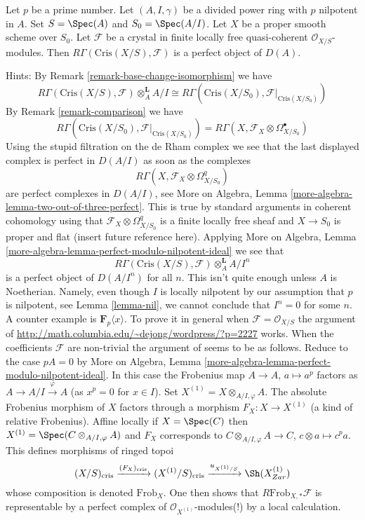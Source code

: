 \begin{remark}[Perfectness]
\label{remark-perfect}
Let $p$ be a prime number. Let $(A, I, \gamma)$ be a divided power
ring with $p$ nilpotent in $A$. Set $S = \Spec(A)$ and
$S_0 = \Spec(A/I)$. Let $X$ be a proper smooth scheme over $S_0$.
Let $\mathcal{F}$ be a crystal in finite locally free
quasi-coherent $\mathcal{O}_{X/S}$-modules.
Then $R\Gamma(\text{Cris}(X/S), \mathcal{F})$ is a
perfect object of $D(A)$.

\medskip\noindent
Hints: By Remark \ref{remark-base-change-isomorphism} we have
$$
R\Gamma(\text{Cris}(X/S), \mathcal{F}) \otimes_A^\mathbf{L} A/I
\cong
R\Gamma(\text{Cris}(X/S_0), \mathcal{F}|_{\text{Cris}(X/S_0)})
$$
By Remark \ref{remark-comparison} we have
$$
R\Gamma(\text{Cris}(X/S_0), \mathcal{F}|_{\text{Cris}(X/S_0)}) =
R\Gamma(X, \mathcal{F}_X \otimes \Omega^\bullet_{X/S_0})
$$
Using the stupid filtration on the de Rham complex we see that
the last displayed complex is perfect in $D(A/I)$ as soon as the complexes
$$
R\Gamma(X, \mathcal{F}_X \otimes \Omega^q_{X/S_0})
$$
are perfect complexes in $D(A/I)$, see
More on Algebra, Lemma \ref{more-algebra-lemma-two-out-of-three-perfect}.
This is true by standard arguments
in coherent cohomology using that $\mathcal{F}_X \otimes \Omega^q_{X/S_0}$
is a finite locally free sheaf and $X \to S_0$ is proper and flat
(insert future reference here). Applying
More on Algebra, Lemma \ref{more-algebra-lemma-perfect-modulo-nilpotent-ideal}
we see that
$$
R\Gamma(\text{Cris}(X/S), \mathcal{F}) \otimes_A^\mathbf{L} A/I^n
$$
is a perfect object of $D(A/I^n)$ for all $n$. This isn't quite enough
unless $A$ is Noetherian. Namely, even though $I$ is locally nilpotent
by our assumption that $p$ is nilpotent, see Lemma \ref{lemma-nil},
we cannot conclude that $I^n = 0$ for some $n$. A counter example
is $\mathbf{F}_p\langle x \rangle$. To prove it in general when
$\mathcal{F} = \mathcal{O}_{X/S}$ the argument of
\url{http://math.columbia.edu/~dejong/wordpress/?p=2227}
works. When the coefficients $\mathcal{F}$ are non-trivial the
argument of \cite{Faltings-very} seems to be as follows. Reduce to the
case $pA = 0$ by More on Algebra, Lemma
\ref{more-algebra-lemma-perfect-modulo-nilpotent-ideal}.
In this case the Frobenius map $A \to A$, $a \mapsto a^p$ factors
as $A \to A/I \xrightarrow{\varphi} A$ (as $x^p = 0$ for $x \in I$). Set
$X^{(1)} = X \otimes_{A/I, \varphi} A$. The absolute Frobenius morphism
of $X$ factors through a morphism $F_X : X \to X^{(1)}$ (a kind of
relative Frobenius). Affine locally if $X = \Spec(C)$ then
$X^{(1)} = \Spec( C \otimes_{A/I, \varphi} A)$
and $F_X$ corresponds to $C \otimes_{A/I, \varphi} A \to C$,
$c \otimes a \mapsto c^pa$. This defines morphisms of ringed topoi
$$
(X/S)_{\text{cris}}
\xrightarrow{(F_X)_{\text{cris}}}
(X^{(1)}/S)_{\text{cris}}
\xrightarrow{u_{X^{(1)}/S}}
\Sh(X^{(1)}_{Zar})
$$
whose composition is denoted $\text{Frob}_X$. One then shows that
$R\text{Frob}_{X, *}\mathcal{F}$ is representable by a
perfect complex of $\mathcal{O}_{X^{(1)}}$-modules(!)
by a local calculation.
\end{remark}

